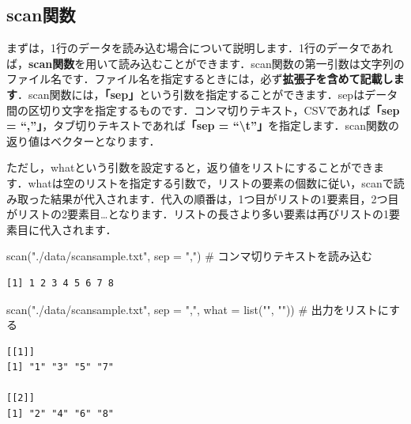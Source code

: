 \documentclass[
  letterpaper,
  DIV=11,
  numbers=noendperiod]{scrreprt}
\newenvironment{Shaded}{\begin{snugshade}}{\end{snugshade}}
\newcommand{\AttributeTok}[1]{\textcolor[rgb]{0.40,0.45,0.13}{#1}}
\newcommand{\CommentTok}[1]{\textcolor[rgb]{0.37,0.37,0.37}{#1}}
\newcommand{\FunctionTok}[1]{\textcolor[rgb]{0.28,0.35,0.67}{#1}}
\newcommand{\NormalTok}[1]{\textcolor[rgb]{0.00,0.23,0.31}{#1}}
\newcommand{\StringTok}[1]{\textcolor[rgb]{0.13,0.47,0.30}{#1}}
\begin{document}
\hypertarget{scanux95a2ux6570}{%
\subsection{scan関数}\label{scanux95a2ux6570}}

まずは，1行のデータを読み込む場合について説明します．1行のデータであれば，\textbf{scan関数}を用いて読み込むことができます．scan関数の第一引数は文字列のファイル名です．ファイル名を指定するときには，必ず\textbf{拡張子を含めて記載します}．scan関数には，\textbf{「sep」}という引数を指定することができます．sepはデータ間の区切り文字を指定するものです．コンマ切りテキスト，CSVであれば\textbf{「sep
= ``,''」}，タブ切りテキストであれば\textbf{「sep =
``\textbackslash t''」}を指定します．scan関数の返り値はベクターとなります．

ただし，whatという引数を設定すると，返り値をリストにすることができます．whatは空のリストを指定する引数で，リストの要素の個数に従い，scanで読み取った結果が代入されます．代入の順番は，1つ目がリストの1要素目，2つ目がリストの2要素目\ldots となります．リストの長さより多い要素は再びリストの1要素目に代入されます．

\begin{Shaded}
\begin{Highlighting}[]
\FunctionTok{scan}\NormalTok{(}\StringTok{"./data/scansample.txt"}\NormalTok{, }\AttributeTok{sep =} \StringTok{","}\NormalTok{) }\CommentTok{\# コンマ切りテキストを読み込む}
\end{Highlighting}
\end{Shaded}

\begin{verbatim}
[1] 1 2 3 4 5 6 7 8
\end{verbatim}

\begin{Shaded}
\begin{Highlighting}[]
\FunctionTok{scan}\NormalTok{(}\StringTok{"./data/scansample.txt"}\NormalTok{, }\AttributeTok{sep =} \StringTok{","}\NormalTok{, }\AttributeTok{what =} \FunctionTok{list}\NormalTok{(}\StringTok{""}\NormalTok{, }\StringTok{""}\NormalTok{)) }\CommentTok{\# 出力をリストにする}
\end{Highlighting}
\end{Shaded}

\begin{verbatim}
[[1]]
[1] "1" "3" "5" "7"

[[2]]
[1] "2" "4" "6" "8"
\end{verbatim}
\end{document}
